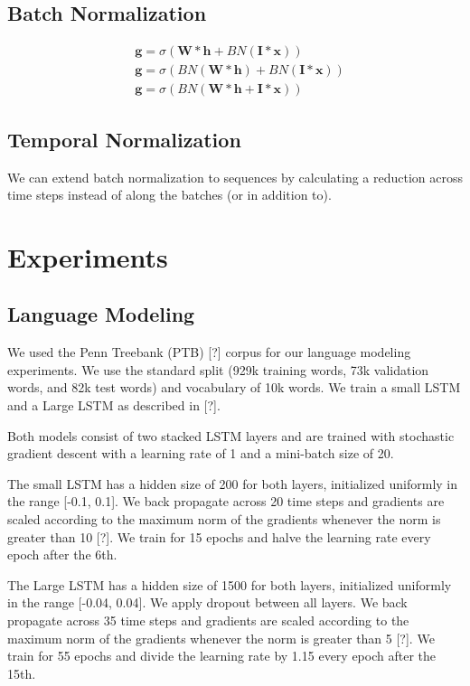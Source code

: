 \documentclass{article}
\begin{document}
\subsection{Batch Normalization}

\begin{equation}
	\begin{split}
		& \boldsymbol g = \sigma(\boldsymbol W * \boldsymbol h + BN(\boldsymbol I * \boldsymbol x)) \\
		& \boldsymbol g = \sigma(BN(\boldsymbol W * \boldsymbol h) + BN(\boldsymbol I * \boldsymbol x)) \\
		& \boldsymbol g = \sigma(BN(\boldsymbol W * \boldsymbol h + \boldsymbol I * \boldsymbol x)) \nonumber
	\end{split}
\end{equation}

\subsection{Temporal Normalization}
We can extend batch normalization to sequences by calculating a reduction across time steps instead of along the batches (or in addition to). 

\section{Experiments}

\subsection{Language Modeling}
We used the Penn Treebank (PTB) [?] corpus for our language modeling experiments. We use the standard split (929k training words, 73k validation words, and 82k test words) and vocabulary of 10k words. We train a small LSTM and a Large LSTM as described in [?].

Both models consist of two stacked LSTM layers and are trained with stochastic gradient descent with a learning rate of 1 and a mini-batch size of 20.

The small LSTM has a hidden size of 200 for both layers, initialized uniformly in the range [-0.1, 0.1]. We back propagate across 20 time steps and gradients are scaled according to the maximum norm of the gradients whenever the norm is greater than 10 [?]. We train for 15 epochs and halve the learning rate every epoch after the 6th.  

The Large LSTM has a hidden size of 1500 for both layers, initialized uniformly in the range [-0.04, 0.04]. We apply dropout between all layers. We back propagate across 35 time steps and gradients are scaled according to the maximum norm of the gradients whenever the norm is greater than 5 [?]. We train for 55 epochs and divide the learning rate by 1.15 every epoch after the 15th.
\end{document}
